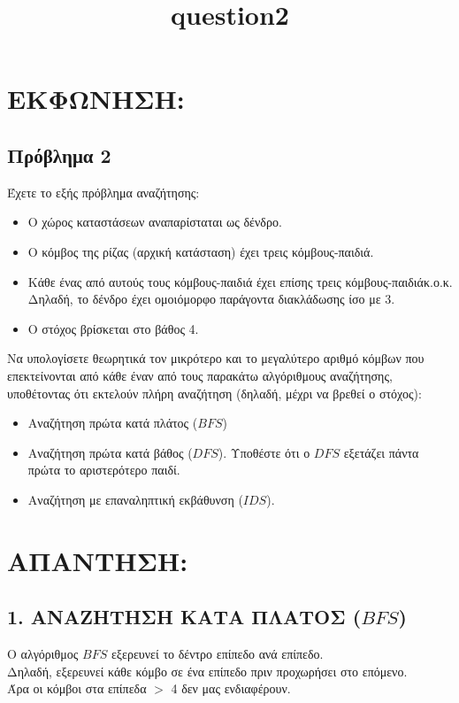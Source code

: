 \documentclass{article}
\begin{document}
\title{\textlatin{question2}}
\maketitle
\section*{ΕΚΦΩΝΗΣΗ:}

\subsection*{Πρόβλημα 2}
Έχετε το εξής πρόβλημα αναζήτησης:
\begin{itemize}
  \item Ο χώρος καταστάσεων αναπαρίσταται ως δένδρο.
  \item Ο κόμβος της ρίζας (αρχική κατάσταση) έχει τρεις κόμβους-παιδιά.
  \item Κάθε ένας από αυτούς τους κόμβους-παιδιά έχει επίσης τρεις κόμβους-παιδιάκ.ο.κ. Δηλαδή, το δένδρο έχει ομοιόμορφο παράγοντα διακλάδωσης ίσο με 3.
  \item Ο στόχος βρίσκεται στο βάθος 4.
\end{itemize}
Να υπολογίσετε θεωρητικά τον μικρότερο και το μεγαλύτερο αριθμό κόμβων που
επεκτείνονται από κάθε έναν από τους παρακάτω αλγόριθμους αναζήτησης,
υποθέτοντας ότι εκτελούν πλήρη αναζήτηση (δηλαδή, μέχρι να βρεθεί ο στόχος):
\begin{itemize}
  \item Αναζήτηση πρώτα κατά πλάτος (\(BFS\))
  \item Αναζήτηση πρώτα κατά βάθος (\(DFS\)). Υποθέστε ότι ο \(DFS\) εξετάζει πάντα πρώτα το αριστερότερο παιδί.
  \item Αναζήτηση με επαναληπτική εκβάθυνση (\(IDS\)).
\end{itemize}

\section*{ΑΠΑΝΤΗΣΗ:}
\subsection*{1. ΑΝΑΖΗΤΗΣΗ ΚΑΤΑ ΠΛΑΤΟΣ (\(BFS\))}
Ο αλγόριθμος \(BFS\) εξερευνεί το δέντρο επίπεδο ανά επίπεδο.\\
Δηλαδή, εξερευνεί κάθε κόμβο σε ένα επίπεδο πριν προχωρήσει στο επόμενο.\\
Άρα οι κόμβοι στα επίπεδα \(>\) 4 δεν μας ενδιαφέρουν.
\end{document}
